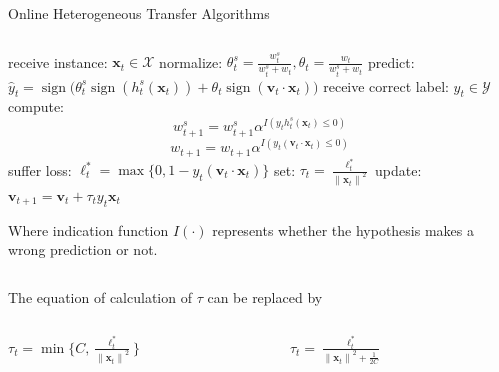 \documentclass{beamer}
\DeclareMathOperator{\sign}{sign}
\begin{document}
\begin{frame}{Online Heterogeneous Transfer Algorithms}
\begin{columns}
\begin{column}{0.5\textwidth}
\begin{algorithm}[H]
\begin{algorithmic}[1]
\STATE 
  receive instance: $\mathbf{x}_t \in \mathcal{X}$
\STATE
  normalize: $\theta_{t}^{s} = \frac{w_{t}^{s}}{w_{t}^{s}+w_t}, \theta_{t} = \frac{w_{t}}{w_{t}^{s}+w_t}$
\STATE
  predict: $\hat{y}_t = \sign \big( \theta_{t}^{s} \sign (h_{t}^{s}(\mathbf{x}_t)) + \theta_{t} \sign (\mathbf{v}_t \cdot \mathbf{x}_t) \big)$
\STATE
  receive correct label: $y_t \in \mathcal{Y}$
\STATE
  compute: 
    $$w_{t+1}^{s} = w_{t+1}^{s} \alpha ^ {I(y_t h_{t}^{s}(\mathbf{x}_t) \leq 0)}  $$
    $$w_{t+1} = w_{t+1} \alpha ^ {I(y_t (\mathbf{v}_t \cdot \mathbf{x}_t) \leq 0)}  $$
\STATE
  suffer loss: $\ell_{t}^{*} = \max \{0, 1-y_t(\mathbf{v}_t \cdot \mathbf{x}_t)\}$
\STATE
  set: $\tau_t = \frac{\ell_{t}^{*}}{{\|\mathbf{x}_t\|}^2}$
\STATE
  update: $ \mathbf{v}_{t+1} = \mathbf{v}_t + \tau_t y_t \mathbf{x}_t $
\ENDFOR
\end{algorithmic}
\end{algorithm}
Where indication function $I(\cdot)$ represents whether the hypothesis makes a wrong prediction or not.
\end{column}
\end{columns}
The equation of calculation of $\tau$ can be replaced by 
\begin{columns}
\begin{column}{0.5\textwidth}
$\tau_t = \min \{ C, \frac{\ell_{t}^{*}}{{\|\mathbf{x}_t\|}^2} \} $ 
\end{column}
\begin{column}{0.5\textwidth}
$ \tau_t = \frac{\ell_{t}^{*}}{{\|\mathbf{x}_t\|}^2 + \frac{1}{2C}} $ 
\end{column}
\end{columns}
\end{frame}
\end{document}
